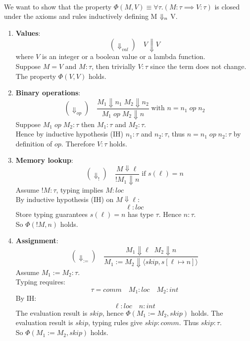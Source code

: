 \begin{solution}
\\
We want to show that the property $\Phi(M,V) \equiv \forall \tau.(M:\tau \implies V:\tau)$ is closed under the axioms and rules inductively defining M $\Downarrow_n$ V.
\begin{enumerate}
\item \textbf{Values}: \[ (\Downarrow_{val}) \quad V \Downarrow  V\]
where $V$ is an integer or a boolean value or a lambda function.
\\
Suppose $M=V$ and $M:\tau$, then trivially $V:\tau$ since the term does not change. The property $\Phi(V,V)$ holds. 
\item \textbf{Binary operations}:
\[(\Downarrow_{op}) \quad\frac{M_1 \Downarrow n_1 \; M_2 \Downarrow n_2}{M_1 \; op\; M_2 \Downarrow n} \; \text{with }n= n_1\;op\;n_2\]
Suppose $M_1\;op\; M_2 : \tau $ then $M_1 : \tau$ and $M_2 : \tau$. \\
Hence by inductive hypothesis (IH) $n_1 : \tau$ and  $n_2 : \tau$, thus $n = n_1\;op\;n_2 : \tau $ by definition of $op$. Therefore $V:\tau$ holds.
\item \textbf{Memory lookup}:
\[(\Downarrow_{!}) \quad \frac{M\Downarrow \ell }{!M_1 \Downarrow n} \; \text{if }s(\ell) = n\]
Assume $!M : \tau$, typing implies $M : loc$\\
By inductive hypothesis (IH) on $M\Downarrow\ell$: \[\ell : loc\]
Store typing guarantees $s(\ell) = n$ has type $\tau$. Hence $n: \tau$.
\\So $\Phi(!M,n) $ holds.
\item \textbf{Assignment}:
\[(\Downarrow_{:=}) \quad \frac{M_1 \Downarrow \ell \; \; M_2\Downarrow n}{M_1 := M_2\Downarrow \langle skip, s[\ell\mapsto n]\rangle} \]
Assume $M_1 := M_2 : \tau$.
\\
Typing requires:
\[\tau= comm \quad M_1:loc\quad M_2: int\]
By IH: 
\[\ell : loc \quad n:int\]
The evaluation result is $skip$, hence $\Phi(M_1 := M_2, skip)$ holds.
The evaluation result is $skip$, typing rules give $skip:comm$. Thus $skip:\tau$.
\\
So $\Phi(M_1:=M_2, skip)$ holds.


\end{enumerate}
\end{solution}
